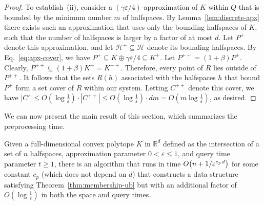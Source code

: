 \documentclass[11pt]{article}   \usepackage[letterpaper,hmargin=2.1cm,vmargin=3cm]{geometry}
\newcommand{\RE}{\mathbb{R}}    \newcommand{\ZZ}{\mathbb{Z}}    \newcommand{\eps}{\varepsilon}  \newcommand{\ST}{\,:\,}         \newcommand{\sq}{\square}
\newcommand{\inv}[1]{\frac{1}{#1}}
\renewcommand{\P}{\kern+1pt}    \newcommand{\N}{\kern-2pt}      \newcommand{\NN}{\kern-4pt}     \newcommand{\polar}[1]{\mathrm{polar}(#1)}            \newcommand{\polarX}[2]{\mathrm{polar}_{#1}(#2)}
\begin{document}
\begin{proof}
To establish~(ii), consider a $(\gamma \eps/4)$-approximation of $K$ within $Q$ that is bounded by the minimum number $m$ of halfspaces. By Lemma~\ref{lem:discrete-apx} there exists such an approximation that uses only the bounding halfspaces of $K$, such that the number of halfspaces is larger by a factor of at most $d$. Let $P^+$ denote this approximation, and let $\mathcal{H}^+ \subseteq \mathcal{H}$ denote its bounding halfspaces. By Eq.~\eqref{eq:apx-cover}, we have $P^+ \subseteq K \oplus \gamma\eps/4 \subseteq K^+$. Let $P^{++} = (1 + \beta) P^+$. Clearly, $P^{++} \subseteq (1 + \beta) K^+ = K^{++}$. Therefore, every point of $R$ lies outside of $P^{++}$. It follows that the sets $R(h)$ associated with the halfspaces $h$ that bound $P^+$ form a set cover of $R$ within our system. Letting $C^{++}$ denote this cover, we have $|C'| \le O(\log \inv{\eps}) \cdot |C^{++}| \le O(\log \inv{\eps}) \cdot d m = O(m \log \inv{\eps})$, as desired.
\end{proof}


We can now present the main result of this section, which summarizes the preprocessing time.

\begin{lemma} \label{lem:preproc-time}
Given a full-dimensional convex polytope $K$ in $\RE^d$ defined as the intersection of a set of $n$ halfspaces, approximation parameter $0 < \eps \le 1$, and query time parameter $t \ge 1$, there is an algorithm that runs in time $O\big(n + 1/\eps^{c_p \P d}\big)$ for some constant $c_p$ (which does not depend on $d$) that constructs a data structure satisfying Theorem~\ref{thm:membership-ub} but with an additional factor of $O(\log \inv{\eps})$ in both the space and query times.
\end{lemma}
\end{document}
